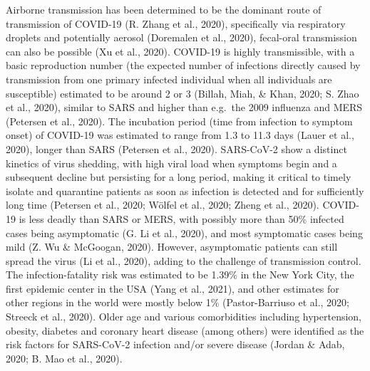 \documentclass[12pt,twoside,openany,\mydriver]{thesis}  %
\begin{document}
Airborne transmission has been determined to be the dominant route of transmission of COVID-19 (R. Zhang et al., 2020), specifically via respiratory droplets and potentially aerosol (Doremalen et al., 2020), fecal-oral transmission can also be possible (Xu et al., 2020). COVID-19 is highly transmissible, with a basic reproduction number (the expected number of infections directly caused by transmission from one primary infected individual when all individuals are susceptible) estimated to be around 2 or 3 (Billah, Miah, \& Khan, 2020; S. Zhao et al., 2020), similar to SARS and higher than e.g.~the 2009 influenza and MERS (Petersen et al., 2020). The incubation period (time from infection to symptom onset) of COVID-19 was estimated to range from 1.3 to 11.3 days (Lauer et al., 2020), longer than SARS (Petersen et al., 2020). SARS-CoV-2 show a distinct kinetics of virus shedding, with high viral load when symptoms begin and a subsequent decline but persisting for a long period, making it critical to timely isolate and quarantine patients as soon as infection is detected and for sufficiently long time (Petersen et al., 2020; Wölfel et al., 2020; Zheng et al., 2020). COVID-19 is less deadly than SARS or MERS, with possibly more than 50\% infected cases being asymptomatic (G. Li et al., 2020), and most symptomatic cases being mild (Z. Wu \& McGoogan, 2020). However, asymptomatic patients can still spread the virus (Li et al., 2020), adding to the challenge of transmission control. The infection-fatality risk was estimated to be 1.39\% in the New York City, the first epidemic center in the USA (Yang et al., 2021), and other estimates for other regions in the world were mostly below 1\% (Pastor-Barriuso et al., 2020; Streeck et al., 2020). Older age and various comorbidities including hypertension, obesity, diabetes and coronary heart disease (among others) were identified as the risk factors for SARS-CoV-2 infection and/or severe disease (Jordan \& Adab, 2020; B. Mao et al., 2020).
\end{document}
